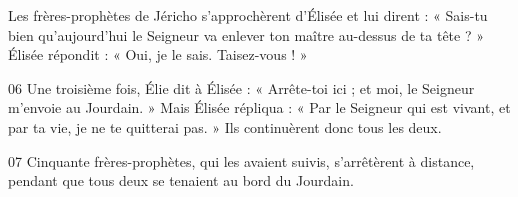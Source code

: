 Les frères-prophètes de Jéricho s’approchèrent d’Élisée et lui dirent : « Sais-tu bien qu’aujourd’hui le Seigneur va enlever ton maître au-dessus de ta tête ? » Élisée répondit : « Oui, je le sais. Taisez-vous ! »

06 Une troisième fois, Élie dit à Élisée : « Arrête-toi ici ; et moi, le Seigneur m’envoie au Jourdain. » Mais Élisée répliqua : « Par le Seigneur qui est vivant, et par ta vie, je ne te quitterai pas. » Ils continuèrent donc tous les deux.

07 Cinquante frères-prophètes, qui les avaient suivis, s’arrêtèrent à distance, pendant que tous deux se tenaient au bord du Jourdain.
